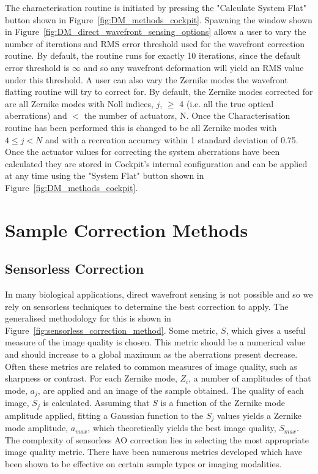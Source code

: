 The characterisation routine is initiated by pressing the "Calculate System Flat" button shown in Figure~\ref{fig:DM_methods_cockpit}. Spawning the window shown in Figure~\ref{fig:DM_direct_wavefront_sensing_options} allows a user to vary the number of iterations and RMS error threshold used for the wavefront correction routine. By default, the routine runs for exactly 10 iterations, since the default error threshold is $\infty$ and so any wavefront deformation will yield an RMS value under this threshold. A user can also vary the Zernike modes the wavefront flatting routine will try to correct for. By default, the Zernike modes corrected for are all Zernike modes with Noll indices, $j$, $\ge$ 4 (i.e. all the true optical aberrations) and $<$ the number of actuators, N. Once the Characterisation routine has been performed this is changed to be all Zernike modes with $4 \le j < N$ and with a recreation accuracy within 1 standard deviation of 0.75.  Once the actuator values for correcting the system aberrations have been calculated they are stored in Cockpit's internal configuration and can be applied at any time using the "System Flat" button shown in Figure~\ref{fig:DM_methods_cockpit}.

\section{Sample Correction Methods}
\label{sec:sample_correction_methods}

\subsection{Sensorless Correction}
\label{subsec:sensorless_correction}

In many biological applications, direct wavefront sensing is not possible and so we rely on sensorless techniques to determine the best correction to apply. The generalised methodology for this is shown in Figure~\ref{fig:sensorless_correction_method}. Some metric, $S$, which gives a useful measure of the image quality is chosen. This metric should be a numerical value and should 
increase to a global maximum as the aberrations present decrease. Often these metrics are related to common measures of image quality, such as sharpness or contrast. For each Zernike mode, $Z_{i}$, a number of amplitudes of that mode, $a_{j}$, are applied and an image of the sample obtained. The quality of each image, $S_{j}$ is calculated. Assuming that $S$ is a function of the Zernike mode amplitude applied,	fitting a Gaussian function to the $S_{j}$ values yields a Zernike mode amplitude, $a_{max}$, which theoretically yields the best image quality, $S_{max}$. The complexity of sensorless AO correction lies in selecting the most appropriate image quality metric. There 
have been numerous metrics developed which have been shown to be effective on certain sample types or imaging modalities\cite{burke2015adaptive,booth2002adaptive,fienup2003aberration,debarre2008adaptive}.

